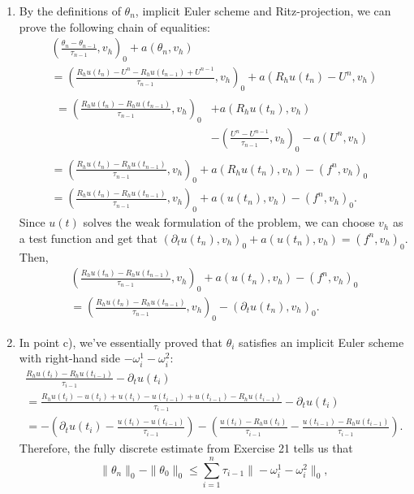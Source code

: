 \documentclass[a4paper]{article}
\begin{document}
\begin{enumerate}[label=\textbf{\alph*)},leftmargin=*]
\item By the definitions of $\theta_n$, implicit Euler scheme and Ritz-projection,
	we can prove the following chain of equalities:
	\begin{gather*}
	\left(\frac{\theta_n-\theta_{n-1}}{\tau_{n-1}},v_h\right)_0
	  + a(\theta_n,v_h) \\
	= \left(\frac{R_h u(t_n)-U^n-R_h u(t_{n-1})+U^{n-1}}{\tau_{n-1}},v_h\right)_0
	  + a(R_h u(t_n)-U^n,v_h) \\
	\begin{split} = \left(\frac{R_h u(t_n)-R_h u(t_{n-1})}{\tau_{n-1}},v_h\right)_0
	  &+ a(R_h u(t_n),v_h) \\[-4pt]
	  &- \left(\frac{U^n-U^{n-1}}{\tau_{n-1}},v_h\right)_0
	  - a(U^n,v_h) \end{split} \\
	= \left(\frac{R_h u(t_n)-R_h u(t_{n-1})}{\tau_{n-1}},v_h\right)_0
	  + a(R_h u(t_n),v_h) - (f^n,v_h)_0 \\
	= \left(\frac{R_h u(t_n)-R_h u(t_{n-1})}{\tau_{n-1}},v_h\right)_0
	  + a(u(t_n),v_h) - (f^n,v_h)_0.
	\end{gather*}
	Since $u(t)$ solves the weak formulation of the problem,
	we can choose $v_h$ as a test function and get that
	$(\partial_t u(t_n), v_h)_0 + a(u(t_n),v_h) = (f^n,v_h)_0$. Then,
	\begin{gather*}
	\left(\frac{R_h u(t_n)-R_h u(t_{n-1})}{\tau_{n-1}},v_h\right)_0
		+ a(u(t_n),v_h) - (f^n,v_h)_0 \\
	= \left(\frac{R_h u(t_n)-R_h u(t_{n-1})}{\tau_{n-1}},v_h\right)_0
		- (\partial_t u(t_n), v_h)_0.
	\end{gather*}
\item In point c), we've essentially proved that $\theta_i$ satisfies
	an implicit Euler scheme with right-hand side $-\omega_i^1-\omega_i^2$:
	\begin{gather*}
	\frac{R_h u(t_i)-R_h u(t_{i-1})}{\tau_{i-1}} - \partial_t u(t_i) \\
	= \frac{R_h u(t_i) -u(t_i) +u(t_i) -u(t_{i-1}) +u(t_{i-1}) -R_h u(t_{i-1})}
		{\tau_{i-1}} - \partial_t u(t_i) \\
	= - \left( \partial_t u(t_i) - \frac{u(t_i)-u(t_{i-1})}{\tau_{i-1}} \right)
	  - \left( \frac{u(t_i) - R_h u(t_i)}{\tau_{i-1}}
	         - \frac{u(t_{i-1}) - R_h u(t_{i-1})}{\tau_{i-1}} \right).
	\end{gather*}
	Therefore, the fully discrete estimate from Exercise 21 tells us that
	\[
	\|\theta_n\|_0-\|\theta_0\|_0\leq\sum^{n}_{i=1}\tau_{i-1}\|-\omega^1_i-\omega^2_i\|_0,
\]
\end{enumerate}
\end{document}
